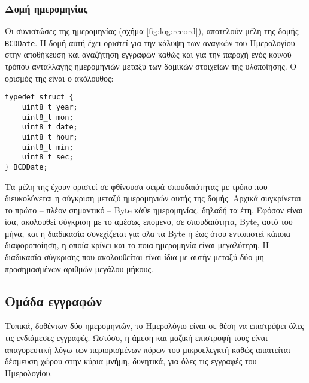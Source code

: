 
\subsubsection{Δομή ημερομηνίας}

Οι συνιστώσες της ημερομηνίας (σχήμα \ref{fig:log:record}), αποτελούν μέλη της
δομής \verb~BCDDate~. Η δομή αυτή έχει οριστεί για την κάλυψη των αναγκών του
Ημερολογίου στην αποθήκευση και αναζήτηση εγγραφών καθώς και για την παροχή ενός
κοινού τρόπου ανταλλαγής ημερομηνιών μεταξύ των δομικών στοιχείων της
υλοποίησης. Ο ορισμός της είναι ο ακόλουθος:
\begin{lstlisting}
typedef struct {
    uint8_t year;
    uint8_t mon;
    uint8_t date;
    uint8_t hour;
    uint8_t min;
    uint8_t sec;
} BCDDate;
\end{lstlisting}

Τα μέλη της έχουν οριστεί σε φθίνουσα σειρά σπουδαιότητας με τρόπο που
διευκολύνεται η σύγκριση μεταξύ ημερομηνιών αυτής της δομής. Αρχικά συγκρίνεται
το πρώτο -- πλέον σημαντικό -- Byte κάθε ημερομηνίας, δηλαδή τα έτη. Εφόσον
είναι ίσα, ακολουθεί σύγκριση με το αμέσως επόμενο, σε σπουδαιότητα, Byte, αυτό
του μήνα, και η διαδικασία συνεχίζεται για όλα τα Byte ή έως ότου εντοπιστεί
κάποια διαφοροποίηση, η οποία κρίνει και το ποια ημερομηνία είναι μεγαλύτερη.
Η διαδικασία σύγκρισης που ακολουθείται είναι ίδια με αυτήν μεταξύ δύο μη
προσημασμένων αριθμών μεγάλου μήκους.

%
%

\subsection{Ομάδα εγγραφών}
Τυπικά, δοθέντων δύο ημερομηνιών, το Ημερολόγιο είναι σε θέση να επιστρέψει όλες
τις ενδιάμεσες εγγραφές. Ωστόσο, η άμεση και μαζική επιστροφή τους είναι
απαγορευτική λόγω των περιορισμένων πόρων του μικροελεγκτή καθώς απαιτείται
δέσμευση χώρου στην κύρια μνήμη, δυνητικά, για όλες τις εγγραφές του
Ημερολογίου.
%

